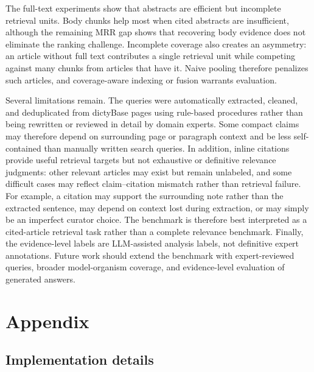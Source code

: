 \documentclass[runningheads]{llncs}
\begin{document}
The full-text experiments show that abstracts are efficient but incomplete retrieval units. Body chunks help most when cited abstracts are insufficient, although the remaining MRR gap shows that recovering body evidence does not eliminate the ranking challenge. Incomplete coverage also creates an asymmetry: an article without full text contributes a single retrieval unit while competing against many chunks from articles that have it. Naive pooling therefore penalizes such articles, and coverage-aware indexing or fusion warrants evaluation.

Several limitations remain. The queries were automatically extracted, cleaned, and deduplicated from dictyBase pages using rule-based procedures rather than being rewritten or reviewed in detail by domain experts. Some compact claims may therefore depend on surrounding page or paragraph context and be less self-contained than manually written search queries. In addition, inline citations provide useful retrieval targets but not exhaustive or definitive relevance judgments: other relevant articles may exist but remain unlabeled, and some difficult cases may reflect claim--citation mismatch rather than retrieval failure. For example, a citation may support the surrounding note rather than the extracted sentence, may depend on context lost during extraction, or may simply be an imperfect curator choice. The benchmark is therefore best interpreted as a cited-article retrieval task rather than a complete relevance benchmark. Finally, the evidence-level labels are LLM-assisted analysis labels, not definitive expert annotations. Future work should extend the benchmark with expert-reviewed queries, broader model-organism coverage, and evidence-level evaluation of generated answers.

\FloatBarrier
\section*{Appendix}
\FloatBarrier
\setcounter{figure}{0}
\renewcommand{\thefigure}{S\arabic{figure}}
\renewcommand{\theHfigure}{S\arabic{figure}}
\setcounter{table}{0}
\renewcommand{\thetable}{S\arabic{table}}
\renewcommand{\theHtable}{S\arabic{table}}

\subsection*{Implementation details}
\end{document}
